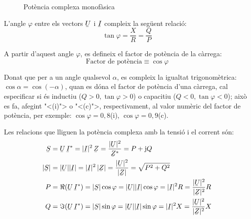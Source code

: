 \begin{figure}[htb]
\centering
{}
\caption{Pot\`{e}ncia complexa monof\`{a}sica} \label{pic:pot_comp_mono}
\end{figure}

L'angle $\varphi$ entre els vectors $\cmplx{U}$ i $\cmplx{I}$ compleix la seg\"{u}ent relaci\'{o}:
\begin{equation}
   \tan\varphi = \frac{X}{R} = \frac{Q}{P}
\end{equation}

A partir d'aquest angle $\varphi$, es defineix el factor de pot\`{e}ncia de la c\`{a}rrega:
\begin{equation}
   \text{Factor de pot\`{e}ncia} \equiv \cos\varphi
\end{equation}

Donat que per a un angle qualsevol $\alpha$, es compleix la igualtat
trigonom\`{e}trica: $\cos\alpha = \cos(-\alpha)$, quan es d\'{o}na el factor
de pot\`{e}ncia d'una c\`{a}rrega, cal especificar si \'{e}s inductiu ($Q>0,
\tan\varphi>0$) o capacitiu ($Q<0, \tan\varphi<0$); aix\`{o} es fa,
afegint {"<}(i){">} o {"<}(c){">}, respectivament, al valor num\`{e}ric del factor
de pot\`{e}ncia, per exemple: $\cos\varphi=0,8$(i),
$\cos\varphi=0,9$(c).

Les relacions que lliguen la pot\`{e}ncia complexa amb la tensi\'{o} i el corrent s\'{o}n:
\begin{align}
   \cmplx{S} &=  \cmplx{U} \,\cmplx{I}^* =
   |\cmplx{I}|^2 \,\cmplx{Z} = \frac{|\cmplx{U}|^2}{\cmplx{Z}^*} =
   P + \ju Q \label{eq:s_mono1}\\
   |\cmplx{S}| &= |\cmplx{U}| |\cmplx{I}| =
   |\cmplx{I}|^2 \,|\cmplx{Z}| = \frac{|\cmplx{U}|^2}{|\cmplx{Z}|} =
   \sqrt{P^2+Q^2} \\
   P &= \Re (\cmplx{U} \, \cmplx{I}^*) = |\cmplx{S}| \cos\varphi =
   |\cmplx{U}| |\cmplx{I}| \cos\varphi = |\cmplx{I}|^2 R =
   \frac{|\cmplx{U}|^2}{|\cmplx{Z}|^2}R\\
   Q &= \Im (\cmplx{U} \, \cmplx{I}^*) = |\cmplx{S}| \sin\varphi =
   |\cmplx{U}| |\cmplx{I}|\sin\varphi  = |\cmplx{I}|^2 X =
   \frac{|\cmplx{U}|^2}{|\cmplx{Z}|^2}X
\end{align}

